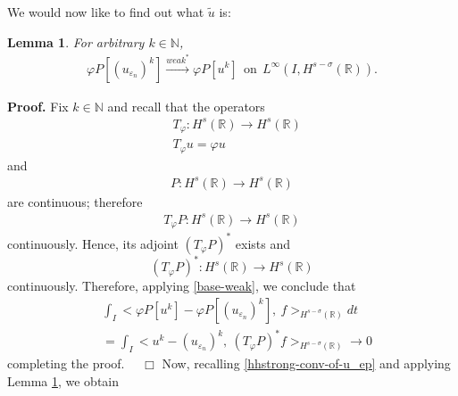 \documentclass[12pt,reqno]{amsart}
\newcommand{\rr}{\mathbb{R}}
\newcommand{\ee}{\varepsilon}
\newcommand{\vp}{\varphi}
\theoremstyle{plain}  %
\newtheorem{lemma}{Lemma}
\theoremstyle{definition}
\begin{document}
\begin{appendices}
		\vskip0.1in
		We would now like to find out what $\tilde{u}$ is:
		\vskip0.1in
		\begin{lemma}
			\label{hhlem:crit-conv}
			For arbitrary $k \in \mathbb{N}$,
			\begin{equation}
				\begin{split}
					\varphi P [(u_{\ee_n})^k] \xrightarrow{weak^*}
					\varphi P [u^k] \ \ \text{on} \ \ L^\infty(I,
					H^{s-\sigma}(\rr)).
					\label{hhcrit-conv-est}
				\end{split}
			\end{equation}
		\end{lemma}
		{\bf Proof.} 
		Fix $k \in \mathbb{N}$ and recall that the operators 
		\begin{equation*}
			\begin{split}
			 & T_\varphi: H^s(\rr) \to H^s(\rr)\\
			 & T_\varphi u = \varphi u
		\end{split}
	\end{equation*}
and 
\begin{equation*}
	\begin{split}
		P:H^s(\rr) \to H^s(\rr)
	\end{split}
\end{equation*}
	are continuous; therefore 
	\begin{equation*}
		\begin{split}
			T_\vp P: H^s(\rr) \to H^s(\rr)
		\end{split}
	\end{equation*}
	continuously. Hence, its adjoint  $(T_\varphi P)^*$
	exists and
		\begin{equation*}
			(T_\varphi P)^*: H^s(\rr) \to H^s(\rr) 
		\end{equation*}
		continuously. Therefore, applying \eqref{base-weak}, we conclude that
		\begin{equation}
			\label{widpseudo}
			\begin{split}
				& \int_I <\varphi P[u^k] - \varphi
				P [(u_{\ee_n})^k],\  f>_{H^{s-\sigma }(\rr)} dt
				\\
				&= \int_I <u^k - 
				 (u_{\ee_n})^k, \ (T_\vp P)^* f>_{H^{s-\sigma }(\rr)} \to 0
			\end{split}
		\end{equation}
		completing the proof. $\quad \Box$
		\vskip0.1in
		Now, recalling \eqref{hhstrong-conv-of-u_ep} and applying Lemma
		\ref{hhlem:crit-conv}, we obtain
			\begin{equation}
			\begin{split}

\end{split}
\end{equation}
\end{appendices}
\end{document}
